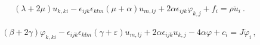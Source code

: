 \documentclass[12pt]{article}
\begin{document}
%
%

\begin{subequations}\label{eq:displa}
  \begin{align}
(\lambda + 2\mu) u_{k, ki} - \epsilon_{ijk} \epsilon_{klm} (\mu + \alpha) u_{m,lj}+ 2\alpha \epsilon_{ijk} \varphi_{k,j} + f_i = \rho \ddot{u}_i\  .
  \end{align}
\end{subequations}

\begin{subequations}\label{eq:rota}
  \begin{align}
(\beta + 2\gamma) \varphi_{k, ki} - \epsilon_{ijk} \epsilon_{klm} (\gamma + \varepsilon) u_{m,lj}+ 2\alpha \epsilon_{ijk} u_{k,j} - 4\alpha\varphi + c_i = J \ddot{\varphi}_i\, ,
  \end{align}
\end{subequations}
\end{document}
